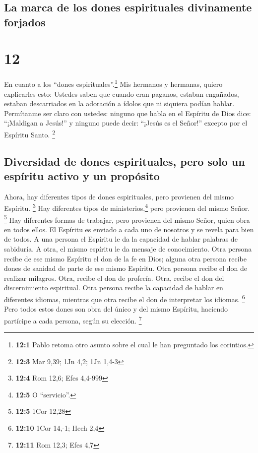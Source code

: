 \hypertarget{la-marca-de-los-dones-espirituales-divinamente-forjados}{%
\subsection{La marca de los dones espirituales divinamente
forjados}\label{la-marca-de-los-dones-espirituales-divinamente-forjados}}

\hypertarget{section-11}{%
\section{12}\label{section-11}}

 En cuanto a los ``dones espirituales''.\footnote{\textbf{12:1}
  Pablo retoma otro asunto sobre el cual le han preguntado los
  corintios.} Mis hermanos y hermanas, quiero explicarles esto:
 Ustedes saben que cuando eran paganos, estaban engañados,
estaban descarriados en la adoración a ídolos que ni siquiera podían
hablar.  Permítanme ser claro con ustedes: ninguno que
habla en el Espíritu de Dios dice: ``¡Maldigan a Jesús!'' y ninguno
puede decir: ``¡Jesús es el Señor!'' excepto por el Espíritu Santo.
\footnote{\textbf{12:3} Mar 9,39; 1Jn 4,2; 1Jn 1,4-3}

\hypertarget{diversidad-de-dones-espirituales-pero-solo-un-espuxedritu-activo-y-un-propuxf3sito}{%
\subsection{Diversidad de dones espirituales, pero solo un espíritu
activo y un
propósito}\label{diversidad-de-dones-espirituales-pero-solo-un-espuxedritu-activo-y-un-propuxf3sito}}

 Ahora, hay diferentes tipos de dones espirituales, pero
provienen del mismo Espíritu. \footnote{\textbf{12:4} Rom 12,6; Efes
  4,4-999}  Hay diferentes tipos de
ministerios,\footnote{\textbf{12:5} O ``servicio''.} pero provienen del
mismo Señor. \footnote{\textbf{12:5} 1Cor 12,28}  Hay
diferentes formas de trabajar, pero provienen del mismo Señor, quien
obra en todos ellos.  El Espíritu es enviado a cada uno de
nosotros y se revela para bien de todos.  A una persona el
Espíritu le da la capacidad de hablar palabras de sabiduría. A otra, el
mismo espíritu le da mensaje de conocimiento.  Otra
persona recibe de ese mismo Espíritu el don de la fe en Dios; alguna
otra persona recibe dones de sanidad de parte de ese mismo Espíritu.
 Otra persona recibe el don de realizar milagros. Otra,
recibe el don de profecía. Otra, recibe el don del discernimiento
espiritual. Otra persona recibe la capacidad de hablar en diferentes
idiomas, mientras que otra recibe el don de interpretar los idiomas.
\footnote{\textbf{12:10} 1Cor 14,-1; Hech 2,4}  Pero
todos estos dones son obra del único y del mismo Espíritu, haciendo
partícipe a cada persona, según su elección. \footnote{\textbf{12:11}
  Rom 12,3; Efes 4,7}


